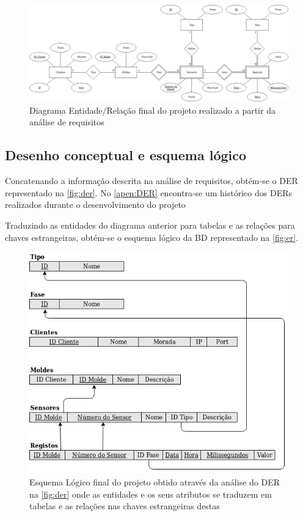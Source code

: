 \documentclass[11pt,twoside,a4paper]{report}
\begin{document}
\begin{landscape}
	\begin{figure}
		\begin{center}
			\includegraphics[width=1.4\textwidth]{diagrama_entidade_relacao} %
			\caption[Diagrama Entidade/Relação final do projeto]{Diagrama Entidade/Relação final do projeto realizado a partir da análise de requisitos}
			\label{fig:der}
		\end{center}
	\end{figure}
\end{landscape}
\subsection{Desenho conceptual e esquema lógico}
Concatenando a informação descrita na análise de requisitos, obtém-se o DER representado na \autoref{fig:der}. No \autoref{apen:DER} encontra-se um histórico dos DERs realizados durante o desenvolvimento do projeto\par
Traduzindo as entidades do diagrama anterior para tabelas e as relações para chaves estrangeiras, obtém-se o esquema lógico da BD representado na \autoref{fig:er}.
\begin{figure}[H]
	\begin{center}
		\includegraphics[width=1\textwidth]{esquema_relacional} %
		\caption[Esquema Lógico final do projeto]{Esquema Lógico final do projeto obtido através da análise do DER na \autoref{fig:der} onde as entidades e os seus atributos se traduzem em tabelas e as relações nas chaves estrangeiras destas}
		\label{fig:er}
	\end{center}
\end{figure}
\end{document}
